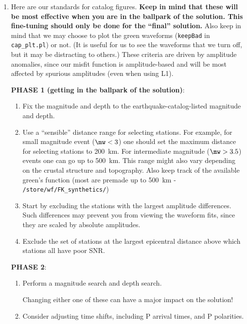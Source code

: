 \begin{enumerate}

\item Here are our standards for catalog figures. {\bf Keep in mind that these will be most effective when you are in the ballpark of the solution. This fine-tuning should only be done for the ``final'' solution.} Also keep in mind that we may choose to plot the green waveforms (\verb+keepBad+ in \verb+cap_plt.pl+) or not. (It is useful for us to see the waveforms that we turn off, but it may be distracting to others.) These criteria are driven by amplitude anomalies, since our misfit function is amplitude-based and will be most affected by spurious amplitudes (even when using L1).

\medskip\noindent
{\bf PHASE 1 (getting in the ballpark of the solution)}:
%
\begin{enumerate}
\item Fix the magnitude and depth to the earthquake-catalog-listed magnitude and depth.

\item Use a ``sensible'' distance range for selecting stations. For example, for small magnitude event ($\mw < 3$) one should set the maximum distance for selecting stations to 200~km. For intermediate magnitude ($\mw > 3.5$) events one can go up to 500~km. This range might also vary depending on the crustal structure and topography. Also keep track of the available green's function (most are premade up to 500~km - \verb+/store/wf/FK_synthetics/+)

\item Start by excluding the stations with the largest amplitude differences. Such differences may prevent you from viewing the waveform fits, since they are scaled by absolute amplitudes.

\item Exclude the set of stations at the largest epicentral distance above which stations all have poor SNR.
\end{enumerate}

\medskip\noindent
{\bf PHASE 2}:
\begin{enumerate}
\item Perform a magnitude search and depth search.

Changing either one of these can have a major impact on the solution!

\item Consider adjusting time shifts, including P arrival times, and P polarities.


\end{enumerate}
\end{enumerate}
